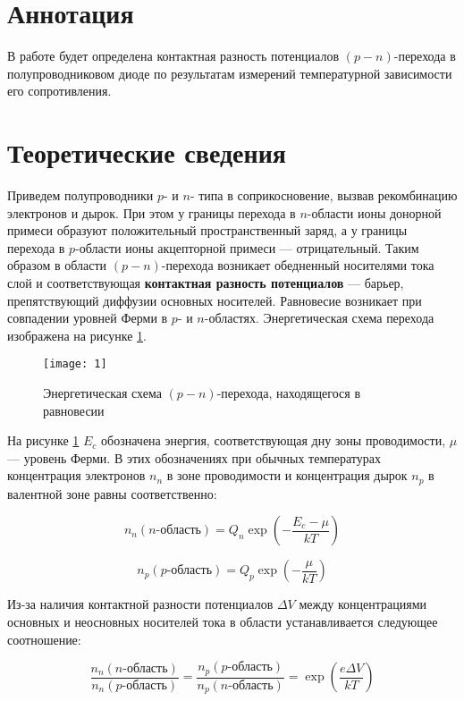 \documentclass[a4paper, 12pt]{article}
\begin{document}

\section{Аннотация}

В работе будет определена контактная разность потенциалов
$(p-n)$-перехода в полупроводниковом диоде по результатам измерений
температурной зависимости его сопротивления.



\section{Теоретические сведения}
Приведем полупроводники $p$- и $n$- типа в соприкосновение, вызвав рекомбинацию электронов и дырок. При этом у границы перехода в $n$-области ионы донорной примеси образуют положительный пространственный заряд, а у границы перехода в $p$-области ионы акцепторной примеси --- отрицательный. Таким образом в области $(p-n)$-перехода возникает обедненный носителями тока слой и соответствующая \textbf{контактная разность потенциалов} --- барьер, препятствующий диффузии основных носителей. Равновесие возникает при совпадении уровней Ферми в $p$- и $n$-областях. Энергетическая схема перехода изображена на рисунке \ref{pic:energy_scheme}. 
	
	\begin{figure}[h]
		\centering	
		\texttt{[image: 1]}
		\caption{Энергетическая схема $(p-n)$-перехода, находящегося в равновесии}
		\label{pic:energy_scheme}
	\end{figure}  
	
	На рисунке \ref{pic:energy_scheme} $E_c$ обозначена энергия,
        соответствующая дну зоны проводимости, $\mu$ --- уровень
        Ферми. В этих обозначениях при обычных температурах
        концентрация электронов $n_n$ в зоне проводимости и концентрация дырок $n_p$ в валентной зоне равны соответственно: 
	
	\[ n_n(n\text{-область}) = Q_n\exp\left(-\frac{E_c - \mu}{kT}\right) \]
	
	\[ n_p(p\text{-область}) = Q_p\exp\left(-\frac{\mu}{kT}\right) \]
	
	Из-за наличия контактной разности потенциалов $\Delta V$ между концентрациями основных и неосновных носителей тока в области устанавливается следующее соотношение:
	
	\[ \frac{n_n(n\text{-область})}{n_n(p\text{-область})} = \frac{n_p(p\text{-область})}{n_p(n\text{-область})} = \exp{\left(\frac{e\Delta V}{kT}\right)} \]
	
\end{document}

